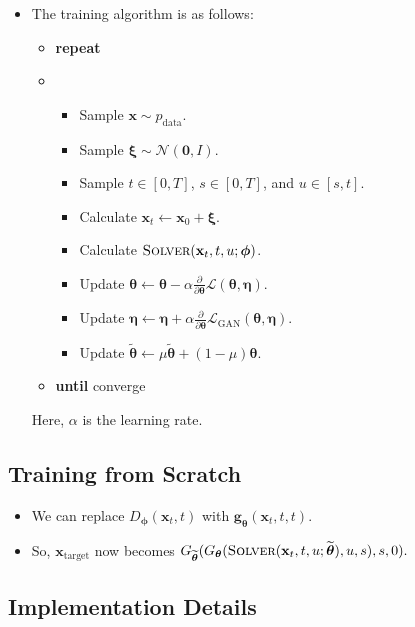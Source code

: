 \documentclass[10pt]{article}
\newcommand{\ve}[1]{\mathbf{#1}}
\newcommand{\ves}[1]{\boldsymbol{#1}}
\newcommand{\mrm}[1]{\mathrm{#1}}
\newcommand{\mcal}[1]{\mathcal{#1}}
\newcommand{\data}{\mathrm{data}}
\begin{document}
\begin{itemize}
  \item The training algorithm is as follows:
  \begin{itemize}
    \item[] {\bf repeat}
    \item[] \begin{itemize}
      \item[] Sample $\ve{x} \sim p_{\data}$.
      \item[] Sample $\ves{\xi} \sim \mcal{N}(\ve{0},I)$.
      \item[] Sample $t \in [0,T]$, $s \in [0,T]$, and $u \in [s,t]$.
      \item[] Calculate $\ve{x}_t \leftarrow \ve{x}_0 + \ves{\xi}$.
      \item[] Calculate $\textsc{Solver}(\ve{x}_t, t, u; \ves{\phi})$.
      \item[] Update $\ves{\theta} \leftarrow \ves{\theta} - \alpha \frac{\partial}{\partial \ves{\theta}} \mcal{L}(\ves{\theta}, \ves{\eta})$.
      \item[] Update $\ves{\eta} \leftarrow \ves{\eta} + \alpha \frac{\partial}{\partial \ves{\theta}} \mcal{L}_{\mrm{GAN}}(\ves{\theta}, \ves{\eta})$.
      \item[] Update $\widetilde{\ves{\theta}} \leftarrow \mu\widetilde{\ves{\theta}} + (1 - \mu)\ves{\theta}$.
    \end{itemize}
    \item[] {\bf until} converge
  \end{itemize}
  Here, $\alpha$ is the learning rate.
\end{itemize}

\subsection{Training from Scratch}

\begin{itemize}
  \item We can replace $D_{\ves{\phi}}(\ve{x}_t, t)$ with $\ve{g}_{\ves{\theta}}(\ve{x}_t, t, t)$.
  
  \item So, $\ve{x}_{\mrm{target}}$ now becomes $G_{\widetilde{\ves{\theta}}}(G_{\ves{\ves{\theta}}}(\textsc{Solver}(\ve{x}_t, t, u; \widetilde{\ves{\theta}}), u, s), s, 0).$
\end{itemize}

\subsection{Implementation Details}
\end{document}
